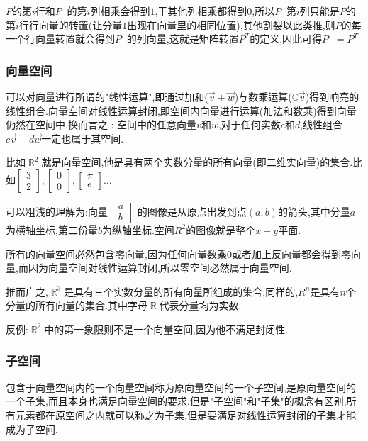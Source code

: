 \documentclass[UTF8,12pt]{ctexbook}
\newcommand{\mathConstant}{\mathbb{C}}
\newcommand{\transpose}{^T}
\DeclareMathOperator{\inverse}{^{-1}}
\DeclareMathOperator{\mathRealNumberCollection}{\mathbb{R}}
\begin{document}
{{{{{  $P$的第$i$行和$P\inverse$的第$i$列相乘会得到$1$,于其他列相乘都得到$0$,所以$P\inverse$第$i$列只能是$P$的第$i$行行向量的转置(让分量$1$出现在向量里的相同位置),其他割裂以此类推,则$P$的每一个行向量转置就会得到$P\inverse$的列向量,这就是矩阵转置$P\transpose$的定义,因此可得$P\inverse = P\transpose$

}%

\subsubsection{向量空间}{
  可以对向量进行所谓的"线性运算",即通过加和($\vec{v} \pm \vec{w}$)与数乘运算($\mathConstant\vec{v}$)得到响亮的线性组合.向量空间对线性运算封闭,即空间内向量进行运算(加法和数乘)得到向量仍然在空间中.换而言之 : 空间中的任意向量$v$和$w$,对于任何实数$c$和$d$,线性组合$c\vec{v} + d\vec{w}$一定也属于其空间.

  比如$\mathRealNumberCollection^2$就是向量空间,他是具有两个实数分量的所有向量(即二维实向量)的集合.比如$\begin{bmatrix}
      3 \\
      2
    \end{bmatrix}
    ,
    \begin{bmatrix}
      0 \\
      0
    \end{bmatrix}
    ,\begin{bmatrix}
      \pi \\
      e
    \end{bmatrix}
    \dots$

  可以粗浅的理解为:向量$\begin{bmatrix}
      a \\
      b
    \end{bmatrix}$
  的图像是从原点出发到点$(a,b)$的箭头,其中分量$a$为横轴坐标,第二份量$b$为纵轴坐标.空间$R^2$的图像就是整个$x-y$平面.

  所有的向量空间必然包含零向量,因为任何向量数乘$0$或者加上反向量都会得到零向量,而因为向量空间对线性运算封闭,所以零空间必然属于向量空间.

  推而广之,$\mathRealNumberCollection^3$是具有三个实数分量的所有向量所组成的集合,同样的,$R^n$是具有$n$个分量的所有向量的集合.其中字母$\mathRealNumberCollection$代表分量均为实数.

  反例:$\mathRealNumberCollection^2$中的第一象限则不是一个向量空间,因为他不满足封闭性.
}%

\subsubsection{子空间}{
  包含于向量空间内的一个向量空间称为原向量空间的一个子空间,是原向量空间的一个子集,而且本身也满足向量空间的要求.但是"子空间"和"子集"的概念有区别,所有元素都在原空间之内就可以称之为子集,但是要满足对线性运算封闭的子集才能成为子空间.

}}}}}
\end{document}
